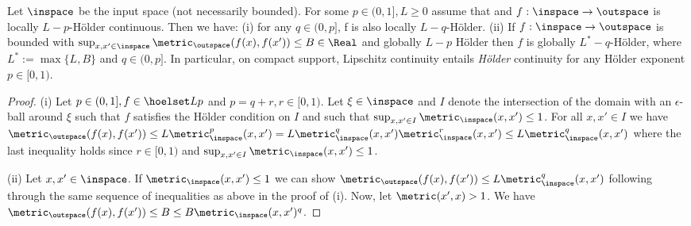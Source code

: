 \begin{lem} \label{lem:hoeldexpprop2}
Let $\inspace$ be the input space (not necessarily bounded). For some $p \in (0,1], L \geq 0$ assume that  and $f:\inspace \to \outspace$ is locally $L-p$-H\"older continuous.
Then we have: (i) for any $ q \in (0,p]$, f is also locally $L-q$-H\"older. 
(ii) If $f:\inspace \to \outspace$ is bounded with $\sup_{x,x' \in \inspace} \metric_\outspace (f(x),f(x')) \leq B \in \Real$ and globally $L-p$ H\"older then $f$ is globally $L^*-q$-H\"older, where $L^* := \max\{L,B \}$ and $q \in (0,p]$. In particular, on compact support, Lipschitz continuity entails \emph{H\"older} continuity for any H\"older exponent $p \in [0,1)$.
\begin{proof}
(i) Let $p \in (0,1], f \in \hoelset L { } p $ and $p = q+r, r \in [0,1)$. Let $\xi \in \inspace$ and $I$ denote the intersection of the domain with an $\epsilon$-ball around $\xi$ such that $f$ satisfies the H\"older condition on $I$ and such that $\sup_{x,x' \in I} \metric_\inspace(x,x') \leq 1$.  For all $x,x' \in I$ we have $\metric_\outspace (f(x),f(x')) \leq L\metric_\inspace^p (x,x') = L \metric_\inspace^q(x,x') \metric_\inspace^r(x,x') \leq L \metric_\inspace^q(x,x')$ where the last inequality holds since $r \in [0,1)$ and $\sup_{x,x' \in I} \metric_\inspace(x,x') \leq 1$.

(ii) Let $x,x' \in \inspace$. If $\metric_\inspace(x,x') \leq 1$ we can show $\metric_\outspace (f(x),f(x'))  \leq L \metric_\inspace^q(x,x')$ following through the same sequence of inequalities as above in the proof of (i). Now, let $\metric(x',x) >1$. We have $\metric_\outspace (f(x),f(x')) \leq B \leq B  \metric_\inspace(x,x')^q$.
\end{proof}
\end{lem}




